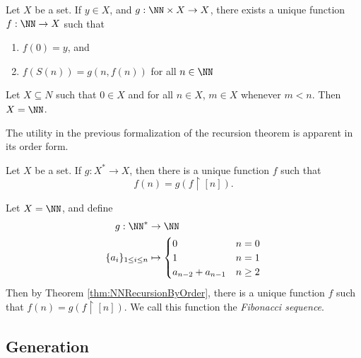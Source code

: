 \documentclass{article}
\begin{document}
\begin{theorem}
    Let $X$ be a set.
    If $y \in X$, and $g: \NN \times X \to X$, there exists a unique function $f: \NN \to X$ such that
    \begin{enumerate}[label=(\roman*)]
        \item $f(0) = y$, and
        \item $f(S(n)) = g(n,f(n))$ for all $n \in \NN$
    \end{enumerate}
\end{theorem}

\begin{theorem}
    Let $X \subseteq N$ such that $0 \in X$ and for all $n \in X$, $m \in X$ whenever $m < n$.
    Then $X = \NN$.
\end{theorem}

The utility in the previous formalization of the recursion theorem is apparent in its order form.

\begin{theorem}
    \label{thm:NNRecursionByOrder}
    Let $X$ be a set.
    If $g: X^\ast \to X$, then there is a unique function $f$ such that
    \[
        f(n) = g(f \upharpoonright [n]).
    \]
\end{theorem}

\begin{example}
    Let $X = \NN$, and define
    \begin{align*}
        g: \NN^\ast 
        &\to
        \NN \\
        \{a_i\}_{1\leq i \leq n}
        &\mapsto
        \begin{cases}
            0 & n = 0 \\
            1 & n = 1 \\
            a_{n-2} + a_{n-1} & n \geq 2 \\
        \end{cases}
    \end{align*}
    Then by Theorem \ref{thm:NNRecursionByOrder}, there is a unique function $f$ such that $f(n) = g(f \upharpoonright [n])$.
    We call this function the \textit{Fibonacci sequence}.
\end{example}

\subsection{Generation}
\end{document}
